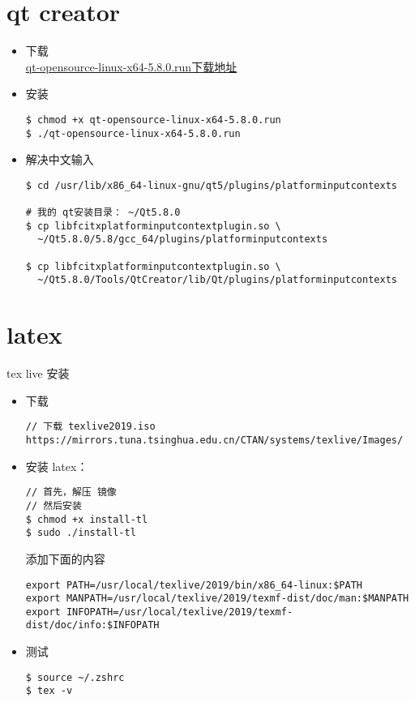 \section{qt creator}
\begin{itemize}
\item 下载 \\
\href{http://iso.mirrors.ustc.edu.cn/qtproject/archive/qt/5.8/5.8.0/qt-opensource-linux-x64-5.8.0.run}{qt-opensource-linux-x64-5.8.0.run下载地址}

\item 安装
\begin{lstlisting}
$ chmod +x qt-opensource-linux-x64-5.8.0.run 
$ ./qt-opensource-linux-x64-5.8.0.run 
\end{lstlisting}

\item 解决中文输入
\begin{lstlisting}
$ cd /usr/lib/x86_64-linux-gnu/qt5/plugins/platforminputcontexts

# 我的 qt安装目录： ~/Qt5.8.0
$ cp libfcitxplatforminputcontextplugin.so \
  ~/Qt5.8.0/5.8/gcc_64/plugins/platforminputcontexts

$ cp libfcitxplatforminputcontextplugin.so \
  ~/Qt5.8.0/Tools/QtCreator/lib/Qt/plugins/platforminputcontexts
\end{lstlisting}
\end{itemize}
\newpage

\section{latex}
tex live 安装 \\

\begin{itemize}
\item 下载
\begin{lstlisting}
// 下载 texlive2019.iso
https://mirrors.tuna.tsinghua.edu.cn/CTAN/systems/texlive/Images/
\end{lstlisting}

\item 安装 latex：
\begin{lstlisting}
// 首先，解压 镜像
// 然后安装
$ chmod +x install-tl
$ sudo ./install-tl
\end{lstlisting}

添加下面的内容
\begin{lstlisting}
export PATH=/usr/local/texlive/2019/bin/x86_64-linux:$PATH
export MANPATH=/usr/local/texlive/2019/texmf-dist/doc/man:$MANPATH
export INFOPATH=/usr/local/texlive/2019/texmf-dist/doc/info:$INFOPATH
\end{lstlisting}

\item 测试
\begin{lstlisting}
$ source ~/.zshrc
$ tex -v
\end{lstlisting}
\end{itemize}
\newpage

